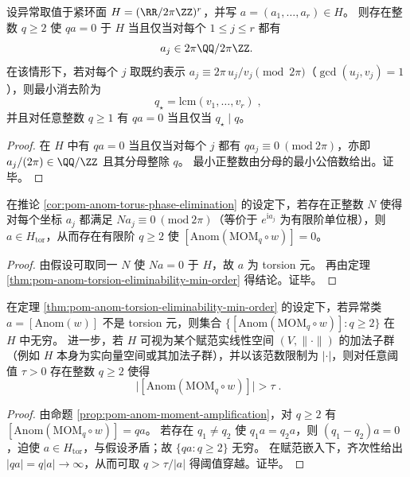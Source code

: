 \begin{corollary}[环面型相位异常的有限覆盖消去与分母最小公倍数律]\label{cor:pom-anom-torus-phase-elimination}
设异常取值于紧环面
\(
H=(\RR/2\pi\ZZ)^r
\)，并写 \(a=(a_1,\dots,a_r)\in H\)。
则存在整数 \(q\ge 2\) 使 \(qa=0\) 于 \(H\) 当且仅当对每个 \(1\le j\le r\) 都有
\[
a_j\in 2\pi\QQ/2\pi\ZZ.
\]
在该情形下，若对每个 \(j\) 取既约表示
\(
a_j\equiv 2\pi\,u_j/v_j\pmod{2\pi}
\)（\(\gcd(u_j,v_j)=1\)），则最小消去阶为
\[
\boxed{\;
q_\star=\mathrm{lcm}(v_1,\dots,v_r)\; },
\]
并且对任意整数 \(q\ge 1\) 有 \(qa=0\) 当且仅当 \(q_\star\mid q\)。
\end{corollary}
\begin{proof}
在 \(H\) 中有 \(qa=0\) 当且仅当对每个 \(j\) 都有 \(q a_j\equiv 0\ (\mathrm{mod}\ 2\pi)\)，亦即 \(a_j/(2\pi)\in \QQ/\ZZ\) 且其分母整除 \(q\)。
最小正整数由分母的最小公倍数给出。证毕。
\end{proof}

\begin{corollary}\label{cor:pom-anom-cyclotomic-phase-torsion}
在推论 \ref{cor:pom-anom-torus-phase-elimination} 的设定下，若存在正整数 \(N\) 使得对每个坐标 \(a_j\) 都满足 \(N a_j\equiv 0\ (\mathrm{mod}\ 2\pi)\)（等价于 \(e^{\mathrm{i}a_j}\) 为有限阶单位根），则 \(a\in H_{\mathrm{tor}}\)，从而存在有限阶 \(q\ge 2\) 使 \([\mathrm{Anom}(\mathrm{MOM}_q\circ w)]=0\)。
\end{corollary}
\begin{proof}
由假设可取同一 \(N\) 使 \(Na=0\) 于 \(H\)，故 \(a\) 为 torsion 元。
再由定理 \ref{thm:pom-anom-torsion-eliminability-min-order} 得结论。证毕。
\end{proof}

\begin{corollary}\label{cor:pom-anom-unbounded-amplification}
在定理 \ref{thm:pom-anom-torsion-eliminability-min-order} 的设定下，若异常类 \(a=[\mathrm{Anom}(w)]\) 不是 torsion 元，则集合
\(
\{[\mathrm{Anom}(\mathrm{MOM}_q\circ w)]:q\ge 2\}
\)
在 \(H\) 中无穷。
进一步，若 \(H\) 可视为某个赋范实线性空间 \((V,\|\cdot\|)\) 的加法子群（例如 \(H\) 本身为实向量空间或其加法子群），并以该范数限制为 \(|\cdot|\)，则对任意阈值 \(\tau>0\) 存在整数 \(q\ge 2\) 使得
\[
\boxed{\;
\bigl|[\mathrm{Anom}(\mathrm{MOM}_q\circ w)]\bigr|>\tau\; }.
\]
\end{corollary}
\begin{proof}
由命题 \ref{prop:pom-anom-moment-amplification}，对 \(q\ge 2\) 有
\(
[\mathrm{Anom}(\mathrm{MOM}_q\circ w)]=qa
\)。
若存在 \(q_1\neq q_2\) 使 \(q_1a=q_2a\)，则 \((q_1-q_2)a=0\)，迫使 \(a\in H_{\mathrm{tor}}\)，与假设矛盾；故 \(\{qa:q\ge 2\}\) 无穷。
在赋范嵌入下，齐次性给出 \(|qa|=q|a|\to\infty\)，从而可取 \(q>\tau/|a|\) 得阈值穿越。证毕。
\end{proof}

